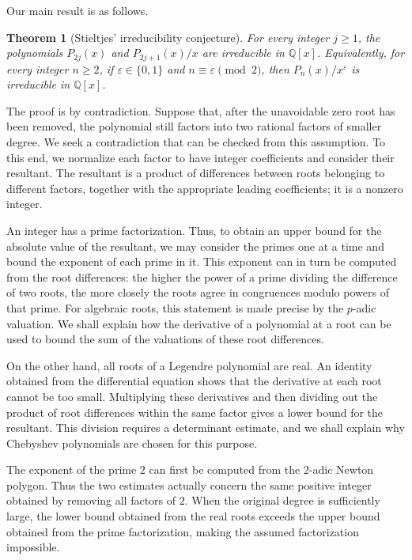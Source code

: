 \documentclass[11pt,a4paper]{article}
\numberwithin{equation}{section}
\newtheorem{theorem}{Theorem}[section]
\theoremstyle{definition}
\begin{document}
Our main result is as follows.

\begin{theorem}[Stieltjes' irreducibility conjecture]\label{thm:main}
For every integer \(j\ge1\), the polynomials \(P_{2j}(x)\) and \(P_{2j+1}(x)/x\) are irreducible in \(\mathbb Q[x]\). Equivalently, for every integer \(n\ge2\), if \(\varepsilon\in\{0,1\}\) and \(n\equiv\varepsilon\pmod2\), then \(P_n(x)/x^\varepsilon\) is irreducible in \(\mathbb Q[x]\).
\end{theorem}

The proof is by contradiction. Suppose that, after the unavoidable zero root has been removed, the polynomial still factors into two rational factors of smaller degree. We seek a contradiction that can be checked from this assumption. To this end, we normalize each factor to have integer coefficients and consider their resultant. The resultant is a product of differences between roots belonging to different factors, together with the appropriate leading coefficients; it is a nonzero integer.

An integer has a prime factorization. Thus, to obtain an upper bound for the absolute value of the resultant, we may consider the primes one at a time and bound the exponent of each prime in it. This exponent can in turn be computed from the root differences: the higher the power of a prime dividing the difference of two roots, the more closely the roots agree in congruences modulo powers of that prime. For algebraic roots, this statement is made precise by the \(p\)-adic valuation. We shall explain how the derivative of a polynomial at a root can be used to bound the sum of the valuations of these root differences.

On the other hand, all roots of a Legendre polynomial are real. An identity obtained from the differential equation shows that the derivative at each root cannot be too small. Multiplying these derivatives and then dividing out the product of root differences within the same factor gives a lower bound for the resultant. This division requires a determinant estimate, and we shall explain why Chebyshev polynomials are chosen for this purpose.

The exponent of the prime \(2\) can first be computed from the $2$-adic Newton polygon. Thus the two estimates actually concern the same positive integer obtained by removing all factors of \(2\). When the original degree is sufficiently large, the lower bound obtained from the real roots exceeds the upper bound obtained from the prime factorization, making the assumed factorization impossible.
\end{document}
